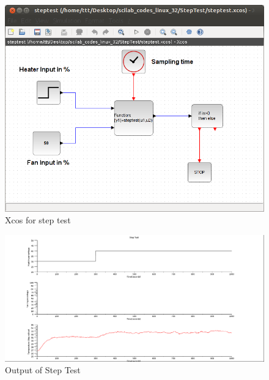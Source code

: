 \begin{figure}
\centering
\includegraphics[width=0.7\linewidth]{vlabs/step-xcos.png}
\caption{Xcos for step test}
\label{step-xcos}
\end{figure}

\begin{figure}
\centering
\includegraphics[width=0.7\linewidth]{vlabs/step-test-output.png}
\caption{Output of Step Test}
\label{step-plot}
\end{figure}

